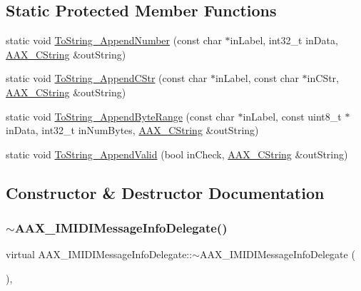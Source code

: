 \subsection*{Static Protected Member Functions}
\begin{DoxyCompactItemize}
\item 
static void \mbox{\hyperlink{a01953_a0ed17623300136c5723cd3ea36804fd0}{To\+String\+\_\+\+Append\+Number}} (const char $\ast$in\+Label, int32\+\_\+t in\+Data, \mbox{\hyperlink{a01573}{A\+A\+X\+\_\+\+C\+String}} \&out\+String)
\item 
static void \mbox{\hyperlink{a01953_a020ec843c8ec267a5afa66415c3df95a}{To\+String\+\_\+\+Append\+C\+Str}} (const char $\ast$in\+Label, const char $\ast$in\+C\+Str, \mbox{\hyperlink{a01573}{A\+A\+X\+\_\+\+C\+String}} \&out\+String)
\item 
static void \mbox{\hyperlink{a01953_a459b5e82caa345b2d0e4f80d3d2a0a0b}{To\+String\+\_\+\+Append\+Byte\+Range}} (const char $\ast$in\+Label, const uint8\+\_\+t $\ast$in\+Data, int32\+\_\+t in\+Num\+Bytes, \mbox{\hyperlink{a01573}{A\+A\+X\+\_\+\+C\+String}} \&out\+String)
\item 
static void \mbox{\hyperlink{a01953_acf29d3b4be3defe93bb3fad8dda3e7ea}{To\+String\+\_\+\+Append\+Valid}} (bool in\+Check, \mbox{\hyperlink{a01573}{A\+A\+X\+\_\+\+C\+String}} \&out\+String)
\end{DoxyCompactItemize}


\subsection{Constructor \& Destructor Documentation}
\mbox{\label{a01953_a33acb96476b625d0efcc066d86087464}} 
\subsubsection{\texorpdfstring{$\sim$AAX\_IMIDIMessageInfoDelegate()}{~AAX\_IMIDIMessageInfoDelegate()}}
{\footnotesize\ttfamily virtual A\+A\+X\+\_\+\+I\+M\+I\+D\+I\+Message\+Info\+Delegate\+::$\sim$\+A\+A\+X\+\_\+\+I\+M\+I\+D\+I\+Message\+Info\+Delegate (\begin{DoxyParamCaption}{ }\end{DoxyParamCaption})\hspace{0.3cm}{\ttfamily [inline]}, {\ttfamily [virtual]}}



